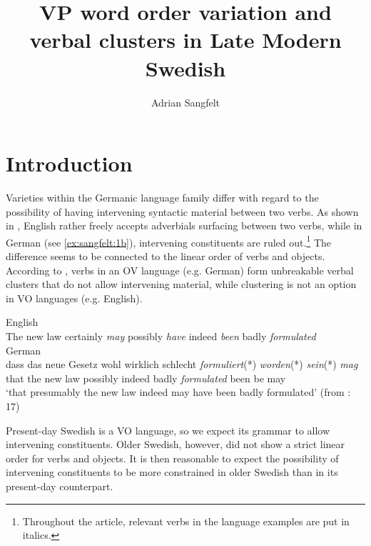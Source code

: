 \documentclass[output=paper, colorlinks, citecolor=brown]{langscibook}
\author{Adrian Sangfelt\orcid{}\affiliation{Uppsala University}}
\title{VP word order variation and verbal clusters in Late Modern Swedish}
\begin{document}
\maketitle 


\section{Introduction}\label{sec:sangfelt:1}

Varieties within the Germanic language family differ with regard to the possibility of having intervening syntactic material between two verbs. As shown in , English rather freely accepts adverbials surfacing between two verbs, while in German (see \ref{ex:sangfelt:1b}), intervening constituents are ruled out.\footnote{Throughout the article, relevant verbs in the language examples are put in italics.} The difference seems to be connected to the linear order of verbs and objects. According to \citet[17–19, 33–35, 287–293]{Haider2010}, verbs in an OV language (e.g. German) form unbreakable verbal clusters that do not allow intervening material, while clustering is not an option in VO languages (e.g. English).

\ea
\label{ex:sangfelt:1}
\ea English\label{ex:sangfelt:1a}\\
The new law {certainly} \textit{may} {possibly} \textit{have} {indeed} \textit{been} {badly} \textit{formulated} \\
\ex German\label{ex:sangfelt:1b}\\
\gll dass das neue Gesetz {wohl} {wirklich} {schlecht} \textit{formuliert}(*) \textit{worden}(*) \textit{sein}(*) \textit{mag} \\
that the new law possibly indeed badly \textit{formulated} been be may \\
\glt ‘that presumably the new law indeed may have been badly formulated’ (from \citealt{Haider2010}: 17)
\z
\z 


Present-day Swedish is a VO language, so we expect its grammar to allow intervening constituents. Older Swedish, however, did not show a strict linear order for verbs and objects. It is then reasonable to expect the possibility of intervening constituents to be more constrained in older Swedish than in its present-day counterpart.
\end{document}

